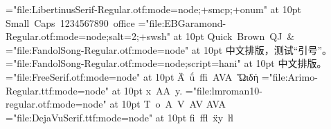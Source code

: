 \font\libsc="file:LibertinusSerif-Regular.otf:mode=node;+smcp;+onum" at 10pt
\hbox{\libsc Small Caps 1234567890 office}
\font\ebsalt="file:EBGaramond-Regular.otf:mode=node;salt=2;+swsh" at 10pt
\hbox{\ebsalt Quick Brown QJ \&}
\font\fs="file:FandolSong-Regular.otf:mode=node" at 10pt
\hbox{\fs 中文排版，测试“引号”。}
\font\fsv="file:FandolSong-Regular.otf:mode=node;script=hani" at 10pt
\hbox{\fsv 中文排版。}
\font\free="file:FreeSerif.otf:mode=node" at 10pt
\hbox{\free Ä̈ ǘ ff\-i AV\-A Ὤιδή}
\font\ar="file:Arimo-Regular.ttf:mode=node" at 10pt
\hbox{\ar {}x AA y\-.}
\font\lm="file:lmroman10-regular.otf:mode=node" at 10pt
\hbox{\ar T\kern1pt o A\hskip 2pt V {\lm A}V}
\hbox{\ar A\lm V\ar A}
\font\dj="file:DejaVuSerif.ttf:mode=node" at 10pt
\hbox{\dj ﬁ ff\-l x\-̈y ŀl}
